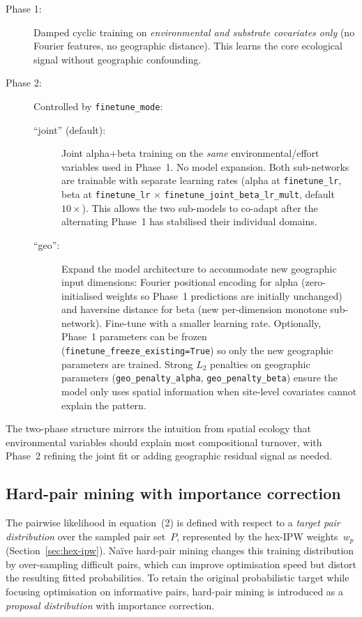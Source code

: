 \documentclass{article}
\begin{document}
\begin{description}
    \item[Phase 1:] Damped cyclic training on \textit{environmental and substrate covariates only} (no Fourier features, no geographic distance). This learns the core ecological signal without geographic confounding.
    
    \item[Phase 2:] Controlled by \texttt{finetune\_mode}:
    \begin{description}
        \item[``joint'' (default):] Joint alpha+beta training on the \textit{same} environmental/effort variables used in Phase~1. No model expansion. Both sub-networks are trainable with separate learning rates (alpha at \texttt{finetune\_lr}, beta at \texttt{finetune\_lr} $\times$ \texttt{finetune\_joint\_beta\_lr\_mult}, default $10\times$). This allows the two sub-models to co-adapt after the alternating Phase~1 has stabilised their individual domains.
        \item[``geo'':] Expand the model architecture to accommodate new geographic input dimensions: Fourier positional encoding for alpha (zero-initialised weights so Phase~1 predictions are initially unchanged) and haversine distance for beta (new per-dimension monotone sub-network). Fine-tune with a smaller learning rate. Optionally, Phase~1 parameters can be frozen (\texttt{finetune\_freeze\_existing=True}) so only the new geographic parameters are trained. Strong $L_2$ penalties on geographic parameters (\texttt{geo\_penalty\_alpha}, \texttt{geo\_penalty\_beta}) ensure the model only uses spatial information when site-level covariates cannot explain the pattern.
    \end{description}
\end{description}

The two-phase structure mirrors the intuition from spatial ecology that environmental variables should explain most compositional turnover, with Phase~2 refining the joint fit or adding geographic residual signal as needed.

\subsection{Hard-pair mining with importance correction}
\label{sec:hard-mining}

The pairwise likelihood in equation~(2) is defined with respect to a \emph{target pair distribution} over the sampled pair set~$P$, represented by the hex-IPW weights~$w_p$ (Section~\ref{sec:hex-ipw}). Na\"ive hard-pair mining changes this training distribution by over-sampling difficult pairs, which can improve optimisation speed but distort the resulting fitted probabilities. To retain the original probabilistic target while focusing optimisation on informative pairs, hard-pair mining is introduced as a \emph{proposal distribution} with importance correction.
\end{document}
